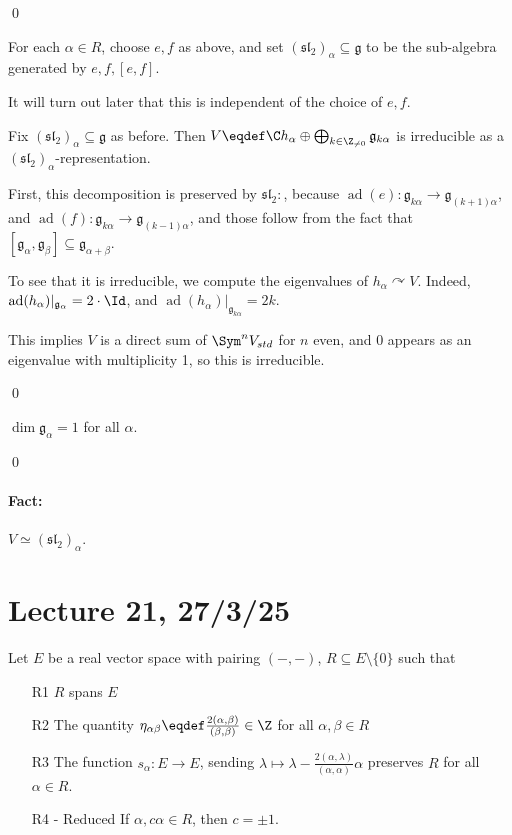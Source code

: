 \documentclass[x11names,reqno,14pt]{extarticle}
\newcommand{\mk}[1]{\mathfrak{#1}}
\newcommand{\g}{\mk{g}}
\DeclareMathOperator{\ad}{ad}
\renewcommand{\sl}{\mk{s}\mk{l}}
\begin{document}
\qed


For each $\alpha \in R$, choose $e, f$ as above, and set $(\sl_2)_\alpha \subseteq \g$ to be the sub-algebra generated by $e, f, [e,f]$. 

It will turn out later that this is independent of the choice of $e, f$. 

\lem

Fix $(\sl_2)_\alpha \subseteq \g$ as before. Then $V \eqdef \C h_\alpha \oplus \bigoplus_{k\in \Z_{\neq0}}\g_{k\alpha}$ is irreducible as a $(\sl_2)_\alpha$-representation. 

\proof

First, this decomposition is preserved by $\sl_2:$, because $\ad(e):\g_{k\alpha} \to \g_{(k+1)\alpha}$, and $\ad(f):\g_{k\alpha}\to\g_{(k-1)\alpha}$, and those follow from the fact that $[\g_\alpha,\g_\beta]\subseteq\g_{\alpha+\beta}$. 

To see that it is irreducible, we compute the eigenvalues of $h_\alpha \curvearrowright V$. Indeed, $\ad(h_\alpha)|_{\g_\alpha} = 2\cdot\Id$, and $\ad(h_\alpha)|_{\g_{k\alpha}} = 2k$. 

This implies $V$ is a direct sum of $\Sym^n V_{std}$ for $n$ even, and 0 appears as an eigenvalue with multiplicity 1, so this is irreducible. 

\qed

\cor

$\dim \g_\alpha = 1$ for all $\alpha$. 

\proof

\qed

\paragraph{Fact:} $V \simeq (\sl_2)_\alpha$. 

\section*{Lecture 21, 27/3/25}

Let $E$ be a real vector space with pairing $(-,-)$, $R \subseteq E\setminus\{0\}$ such that 
\begin{enumerate}

\item[R1] $R$ spans $E$ 

\item[R2] The quantity $\eta_{\alpha\beta} \eqdef \frac{2(\alpha,\beta)}{(\beta,\beta)} \in \Z$ for all $\alpha,\beta\in R$

\item[R3] The function $s_\alpha:E\to E$, sending $\lambda \mapsto \lambda - \frac{2(\alpha,\lambda)}{(\alpha,\alpha)}\alpha$ preserves $R$ for all $\alpha \in R$.

\item[R4 - Reduced] If $\alpha, c\alpha \in R$, then $c = \pm 1$. 

\end{enumerate}
\end{document}
